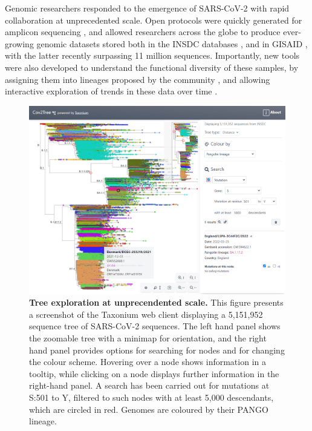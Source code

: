 Genomic researchers responded to the emergence of SARS-CoV-2 with rapid collaboration at unprecedented scale. Open protocols were quickly generated for amplicon sequencing \citep{Tyson2020}, and allowed researchers across the globe to produce ever-growing genomic datasets stored both in the INSDC databases \citep{insdc}, and in GISAID \citep{shu2017gisaid}, with the latter recently surpassing 11 million sequences. Importantly, new tools were also developed to understand the functional diversity of these samples, by assigning them into lineages proposed by the community \citep{rambaut2020dynamic, o2021assignment}, and allowing interactive exploration of trends in these data over time \citep{hodcroft_2021, chen2022cov, outbreakinfo}.


\begin{figure}

\begin{center}
\includegraphics[width=\linewidth]{Figures/cov2tree.png}
\end{center}
\caption{\textbf{Tree exploration at unprecendented scale.} This figure presents a screenshot of the Taxonium web client displaying a 5,151,952 sequence tree of SARS-CoV-2 sequences. The left hand panel shows the zoomable tree with a minimap for orientation, and the right hand panel provides options for searching for nodes and for changing the colour scheme. Hovering over a node shows information in a tooltip, while clicking on a node displays further information in the right-hand panel. A search has been carried out for mutations at S:501 to Y, filtered to such nodes with at least 5,000 descendants, which are circled in red. Genomes are coloured by their PANGO lineage.}
\label{fig:taxonium_client}
\end{figure}

